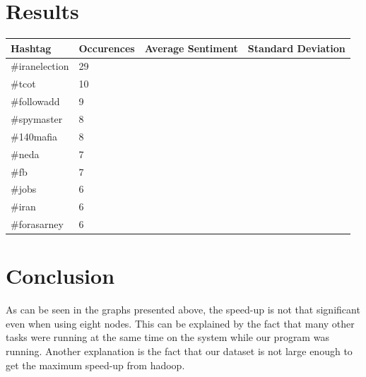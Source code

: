\documentclass[a4paper,12px]{article}
\begin{document}
\section{Results}

\noindent\begin{tabularx}{\textwidth}{p{} p{} p{} p{}}
    Hashtag & Occurences & Average Sentiment & Standard Deviation \\
    \hline
    \#iranelection  & 29 &  &  \\
    \#tcot          & 10 &  &  \\
    \#followadd     & 9  &  &  \\
    \#spymaster     & 8  &  &  \\
    \#140mafia      & 8  &  &  \\
    \#neda          & 7  &  &  \\
    \#fb            & 7  &  &  \\
    \#jobs          & 6  &  &  \\
    \#iran          & 6  &  &  \\
    \#forasarney    & 6  &  &  \\
\end{tabularx}

\section{Conclusion}

As can be seen in the graphs presented above, the speed-up is not that
significant even when using eight nodes. This can be explained by the fact that
many other tasks were running at the same time on the system while our program
was running. Another explanation is the fact that our dataset is not large
enough to get the maximum speed-up from hadoop.



%
%
\end{document}
